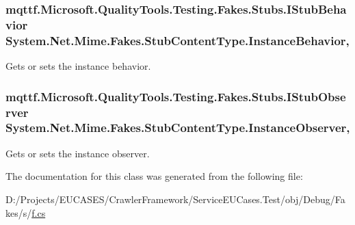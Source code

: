 \hypertarget{class_system_1_1_net_1_1_mime_1_1_fakes_1_1_stub_content_type_acb244f0b962f9a2a82bb7322ecf3b108}{
\subsubsection[{Instance\-Behavior}]{\setlength{\rightskip}{0pt plus 5cm}mqttf.\-Microsoft.\-Quality\-Tools.\-Testing.\-Fakes.\-Stubs.\-I\-Stub\-Behavior System.\-Net.\-Mime.\-Fakes.\-Stub\-Content\-Type.\-Instance\-Behavior\hspace{0.3cm}{\ttfamily [get]}, {\ttfamily [set]}}}\label{class_system_1_1_net_1_1_mime_1_1_fakes_1_1_stub_content_type_acb244f0b962f9a2a82bb7322ecf3b108}


Gets or sets the instance behavior.

\hypertarget{class_system_1_1_net_1_1_mime_1_1_fakes_1_1_stub_content_type_a1f88d9b44cefa23e97afd17f799793c1}{
\subsubsection[{Instance\-Observer}]{\setlength{\rightskip}{0pt plus 5cm}mqttf.\-Microsoft.\-Quality\-Tools.\-Testing.\-Fakes.\-Stubs.\-I\-Stub\-Observer System.\-Net.\-Mime.\-Fakes.\-Stub\-Content\-Type.\-Instance\-Observer\hspace{0.3cm}{\ttfamily [get]}, {\ttfamily [set]}}}\label{class_system_1_1_net_1_1_mime_1_1_fakes_1_1_stub_content_type_a1f88d9b44cefa23e97afd17f799793c1}


Gets or sets the instance observer.



The documentation for this class was generated from the following file\-:\begin{DoxyCompactItemize}
\item 
D\-:/\-Projects/\-E\-U\-C\-A\-S\-E\-S/\-Crawler\-Framework/\-Service\-E\-U\-Cases.\-Test/obj/\-Debug/\-Fakes/s/\hyperlink{s_2f_8cs}{f.\-cs}\end{DoxyCompactItemize}
